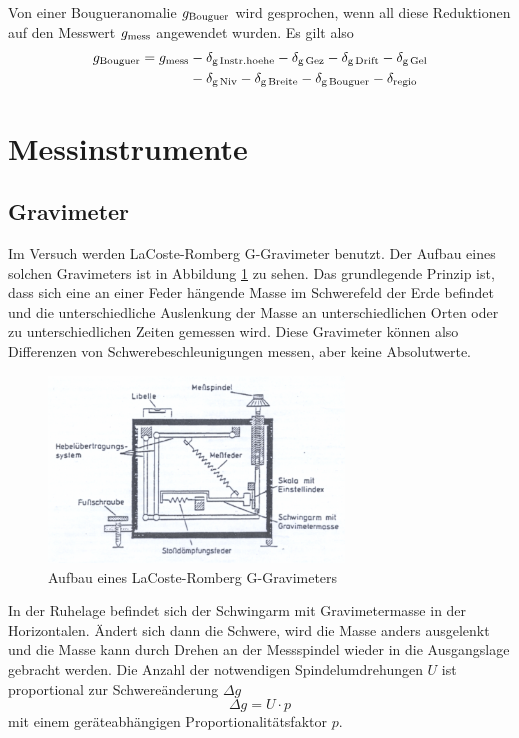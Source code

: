 Von einer Bougueranomalie $g_{\mathrm{Bouguer}}$ wird gesprochen, wenn all diese Reduktionen auf den Messwert $g_{\mathrm{mess}}$ angewendet wurden. Es gilt also
\begin{align}
 g_{\mathrm{Bouguer}}=g_{\mathrm{mess}}&-\delta_{\mathrm{g\,Instr.hoehe}}-\delta_{\mathrm{g\,Gez}}-\delta_{\mathrm{g\,Drift}}-\delta_{\mathrm{g\,Gel}} \\ \notag
 &-\delta_{\mathrm{g\,Niv}}-\delta_{\mathrm{g\,Breite}}-\delta_{\mathrm{g\,Bouguer}}
 -\delta_{\mathrm{regio}}
\end{align}

\section{Messinstrumente}

\subsection{Gravimeter}

Im Versuch werden LaCoste-Romberg G-Gravimeter benutzt. Der Aufbau eines solchen Gravimeters ist in Abbildung \ref{fig:grav} zu sehen. Das grundlegende Prinzip ist, dass sich eine an einer Feder hängende Masse im Schwerefeld der Erde befindet und die unterschiedliche Auslenkung der Masse an unterschiedlichen Orten oder zu unterschiedlichen Zeiten gemessen wird. Diese Gravimeter können also Differenzen von Schwerebeschleunigungen messen, aber keine Absolutwerte.

\begin{figure}
    \centering
   \includegraphics[width=0.7\textwidth]{fig/gravimeter}
 \caption[Aufbau eines LaCoste-Romberg G-Gravimeters]{Aufbau eines LaCoste-Romberg G-Gravimeters \cite{skript}}
 \label{fig:grav}
\end{figure}

In der Ruhelage befindet sich der Schwingarm mit Gravimetermasse in der Horizontalen. Ändert sich dann die Schwere, wird die Masse anders ausgelenkt und die Masse kann durch Drehen an der Messspindel wieder in die Ausgangslage gebracht werden. Die Anzahl der notwendigen Spindelumdrehungen $U$ ist proportional zur Schwereänderung $\Delta g$
\begin{equation}
 \Delta g= U\cdot p
\end{equation}
mit einem geräteabhängigen Proportionalitätsfaktor $p$.

